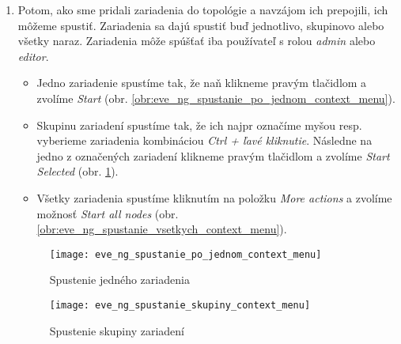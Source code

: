 \begin{enumerate}[noitemsep]
    \item Potom, ako sme pridali zariadenia do topológie a navzájom ich prepojili, ich môžeme spustiť. Zariadenia sa dajú spustiť buď jednotlivo, skupinovo alebo všetky naraz. Zariadenia môže spúšťať iba používateľ s rolou \emph{admin} alebo \emph{editor}.

    \begin{itemize}[noitemsep]
        \item Jedno zariadenie spustíme tak, že naň klikneme pravým tlačidlom a zvolíme \emph{Start} (obr. \ref{obr:eve_ng_spustanie_po_jednom_context_menu}).
        \item Skupinu zariadení spustíme tak, že ich najpr označíme myšou resp. vyberieme zariadenia kombináciou \emph{Ctrl + ľavé kliknutie}. Následne na jedno z označených zariadení klikneme pravým tlačidlom a zvolíme \emph{Start Selected} (obr. \ref{obr:eve_ng_spustanie_skupiny_context_menu}).
        \item Všetky zariadenia spustíme kliknutím na položku \emph{More actions} a zvolíme možnosť \emph{Start all nodes} (obr. \ref{obr:eve_ng_spustanie_vsetkych_context_menu}).
    \end{itemize}

\begin{comment}
\begin{figure}
    \centering
    \texttt{[image: eve\_ng\_spustanie\_po\_jednom\_context\_menu]}
    \caption{Spustenie jedného zariadenia}
    \label{obr:eve_ng_spustanie_po_jednom_context_menu}
\end{figure}

\begin{figure}
    \centering
    \texttt{[image: eve\_ng\_spustanie\_skupiny\_context\_menu]}
    \caption{Spustenie skupiny zariadení}
    \label{obr:eve_ng_spustanie_skupiny_context_menu}
\end{figure}
\end{comment}

\begin{figure}
\begin{minipage}{.4\textwidth}
    \vspace{1.1cm}
    \centering
    \texttt{[image: eve\_ng\_spustanie\_po\_jednom\_context\_menu]}
    \caption{Spustenie jedného zariadenia}
\label{obr:eve_ng_spustanie_po_jednom_context_menu}
\end{minipage}%
\begin{minipage}{.6\textwidth}
    \centering
    \texttt{[image: eve\_ng\_spustanie\_skupiny\_context\_menu]}
    \caption{Spustenie skupiny zariadení}
    \label{obr:eve_ng_spustanie_skupiny_context_menu}
\end{minipage}
\end{figure}


\end{enumerate}

